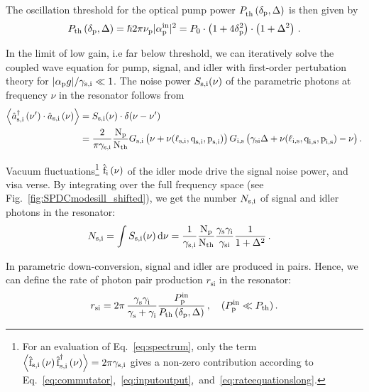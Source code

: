 \documentclass[aps,pra,showpacs,reprint,onecolumn,notitlepage]{revtex4-1}
\makeatletter
\newcommand{\avr}[1]{\mathop{\left\langle #1 \right\rangle}\nolimits}
\newcommand{\tx}[1]{\textnormal{#1}}
\def\@fnsymbol#1{\ensuremath{\ifcase#1\or *\or \dagger\or \ddagger\or
   \mathsection\or \mathparagraph\or \|\or **\or \dagger\dagger
   \or \ddagger\ddagger \else\@ctrerr\fi}}
\newcommand{\ssym}[1]{^{\@fnsymbol{#1}}}
\makeatother
\begin{document}
The oscillation threshold for the optical pump power $P^\tx{}_\textrm{th}\left( \delta_\textrm{p},\Delta\right)$ is then given by
\begin{align}
	 P_\textrm{th} \left( \delta_\textrm{p},\Delta\right) = \hslash 2 \pi \nu_\tx{p}  |\alpha^\tx{in}_\tx{p}|^2 = P_\textrm{0} \cdot \left(1 + 4 \delta_\textrm{p}^2 \right) \cdot \left(1 +  \Delta^2\right)   \,.
\label{eq:threshold}
\end{align}

In the limit of low gain, i.e far below threshold, we can iteratively solve the coupled wave equation for pump, signal, and idler with first-order pertubation theory for $|\alpha_\tx{p} g| / \gamma_\tx{s,i} \ll 1$. The noise power $S_\tx{s,i} (\nu)$ of the parametric photons at frequency $\nu$ in the resonator follows from 
\begin{alignat}{3}
	\avr{\hat{a}_\tx{s,i}\ssym{2} \left( \nu^\prime \right)\cdot \hat{a}_\tx{s,i} \left( \nu \right) } &= S_\tx{s,i} (\nu)  \cdot \delta(\nu - \nu^\prime) 
	\notag \\ 
	&=  \frac{2}{\pi \gamma_\tx{s,i}} \frac{ \tx{N}_\tx{p} }{\tx{N}_\tx{th}}  {{G}_\tx{s,i}\left( \nu + \nu (\ell_\textrm{s,i},\textrm{q}_\textrm{s,i},\textrm{p}_\textrm{s,i} ) \right)} \, {{G}_\tx{i,s} \left( \gamma_\tx{si} \Delta + \nu (\ell_\textrm{i,s},\textrm{q}_\textrm{i,s},\textrm{p}_\textrm{i,s} )  - \nu \right)}  \, .
\label{eq:spectrum}
\end{alignat} 

Vacuum fluctuations\footnote{For an evaluation of Eq.~\ref{eq:spectrum}, only the term $\avr{ \hat{\tx{f}}_\tx{s,i} \left( \nu\right) \hat{\tx{f}}_\tx{s,i} \ssym{2} \left( \nu\right) } = 2 \pi \gamma_\tx{s,i}$ gives a non-zero contribution according to Eq.~\ref{eq:commutator},~\ref{eq:inputoutput},~and~\ref{eq:rateequationslong}.} $\hat{\tx{f}}_\tx{i} \left( \nu\right)$ of the idler mode drive the signal noise power, and visa verse. By integrating over the full frequency space (see Fig.~\ref{fig:SPDCmodesill_shifted}), we get the number $N_\tx{s,i}$ of signal and idler photons in the resonator: 
\begin{align}
	N_\tx{s,i} &= \int S_\tx{s,i} (\nu) \, \tx{d} \nu = \frac{1}{\gamma_\tx{s,i}} \frac{ \tx{N}_\tx{p} }{\tx{N}_\tx{th}}  \frac{\gamma_\tx{s} \gamma_\tx{i} }{\gamma_\tx{si}} \frac{1}{1 + \Delta^2} \,  .  
	\label{eq:twophotonstate}
\end{align}

In parametric down-conversion, signal and idler are produced in pairs. Hence, we can define the rate of photon pair production ${r_\textrm{si}}{}$ in the resonator:
\begin{align}
	{r_\textrm{si}}{} = 2 \pi \,  \frac{\gamma^{}_\textrm{s} \gamma^{}_\textrm{i}}{\gamma^{}_\textrm{s} + \gamma^{}_\textrm{i}}  \frac{P^\tx{in}_\textrm{p}}{P_\textrm{th}\left( \delta_\textrm{p},\Delta \right)}  \, ,\quad (P^\tx{in}_\textrm{p} \ll P_\textrm{th})  \,.
\label{eq:rategenbelow}
\end{align}
\end{document}

